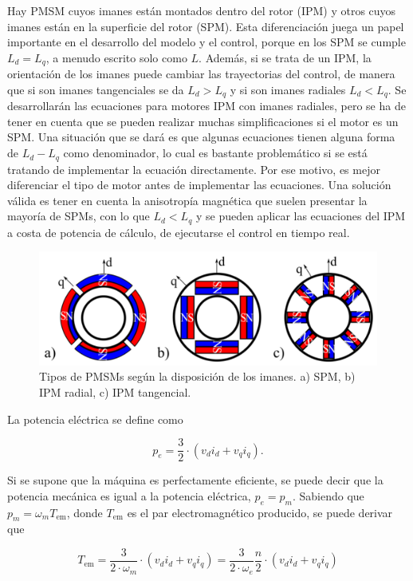 Hay PMSM cuyos imanes están montados dentro del rotor (IPM) y otros cuyos imanes están en la superficie del rotor (SPM). Esta diferenciación juega un papel importante en el desarrollo del modelo y el control, porque en los SPM se cumple \(L_d = L_q\), a menudo escrito solo como \(L\). Además, si se trata de un IPM, la orientación de los imanes puede cambiar las trayectorias del control, de manera que si son imanes tangenciales se da \(L_d > L_q\) y si son imanes radiales \(L_d < L_q\). Se desarrollarán las ecuaciones para motores IPM con imanes radiales, pero se ha de tener en cuenta que se pueden realizar muchas simplificaciones si el motor es un SPM. Una situación que se dará es que algunas ecuaciones tienen alguna forma de \(L_d - L_q\) como denominador, lo cual es bastante problemático si se está tratando de implementar la ecuación directamente. Por ese motivo, es mejor diferenciar el tipo de motor antes de implementar las ecuaciones. Una solución válida es tener en cuenta la anisotropía magnética que suelen presentar la mayoría de SPMs, con lo que \(L_d < L_q\) y se pueden aplicar las ecuaciones del IPM a costa de potencia de cálculo, de ejecutarse el control en tiempo real.

\begin{figure}[H]
	\centering
	\includegraphics[width=0.7\linewidth]{fig/motor-types}
	\caption{Tipos de PMSMs según la disposición de los imanes. a) SPM, b) IPM radial, c) IPM tangencial.}
\end{figure}


La potencia eléctrica se define como

\begin{equation}
p_e = \frac{3}{2}\cdot(v_d i_d + v_q i_q) \text{.}
\end{equation}

Si se supone que la máquina es perfectamente eficiente, se puede decir que la potencia mecánica es igual a la potencia eléctrica, \(p_e = p_m\). Sabiendo que \(p_m = \omega_m T_{\text{em}}\), donde \(T_{\text{em}}\) es el par electromagnético producido, se puede derivar que

\begin{equation}
T_{\text{em}} = \frac{3}{2\cdot \omega_m}\cdot(v_d i_d + v_q i_q) = \frac{3}{2\cdot \omega_e}\frac{n}{2}\cdot(v_d i_d + v_q i_q)
\end{equation}

